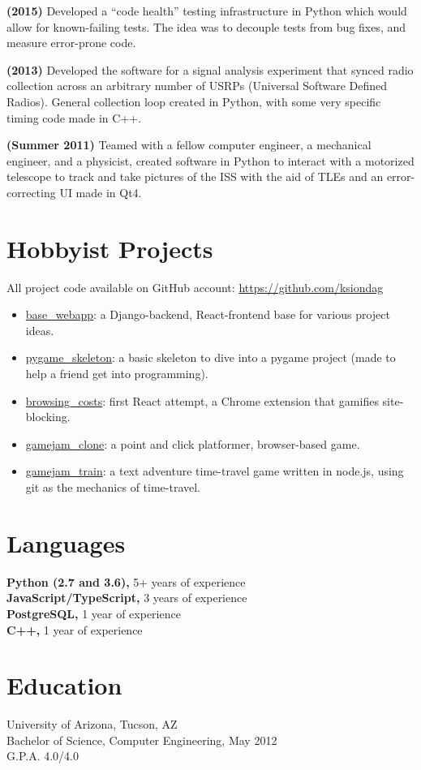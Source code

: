 \documentclass{res}
\begin{document}
\begin{resume}
  {\bf (2015) } Developed a ``code health'' testing infrastructure in Python which would allow for 
  known-failing tests. The idea was to decouple tests from bug fixes, and measure error-prone code.

  {\bf (2013) } Developed the software for a signal analysis experiment that synced radio collection across
  an arbitrary number of USRPs (Universal Software Defined Radios). General collection loop created in Python,
  with some very specific timing code made in C++.

  {\bf (Summer 2011) } Teamed with a fellow computer engineer, a mechanical engineer, and a
  physicist, created software in Python to interact with a motorized telescope to track
  and take pictures of the ISS with the aid of TLEs and an error-correcting UI made in Qt4.
\vspace{0.1in}
    
 
\section{Hobbyist Projects}
All project code available on GitHub account: \url{https://github.com/ksiondag}
  \begin{itemize}
    \item \href{https://github.com/ksiondag/base_webapp}{base\_webapp}: a Django-backend, React-frontend
    base for various project ideas.
    \item \href{https://github.com/ksiondag/pygame_skeleton}{pygame\_skeleton}: a basic skeleton to dive
    into a pygame project (made to help a friend get into programming).
    \item \href{https://github.com/ksiondag/browsing_costs}{browsing\_costs}: first React attempt, a
    Chrome extension that gamifies site-blocking.
    \item \href{https://github.com/ksiondag/gamejam_clone}{gamejam\_clone}: a point and click platformer,
    browser-based game.
    \item \href{https://github.com/ksiondag/gamejam_train}{gamejam\_train}: a text adventure time-travel
    game written in node.js, using git as the mechanics of time-travel.
  \end{itemize}
\vspace{0.1in}

  
\section{Languages} 
\vspace{0.1in}
  {\bf Python (2.7 and 3.6),} 5+ years of experience\\
  {\bf JavaScript/TypeScript,} 3 years of experience\\
  {\bf PostgreSQL,} 1 year of experience\\
  {\bf C++,} 1 year of experience
  
\section{Education}
\vspace{0.1in} 
  University of Arizona, Tucson, AZ  \\        
  Bachelor of Science, Computer Engineering, May 2012   \\       
  G.P.A. 4.0/4.0          
    
 
\end{resume}
\end{document}
